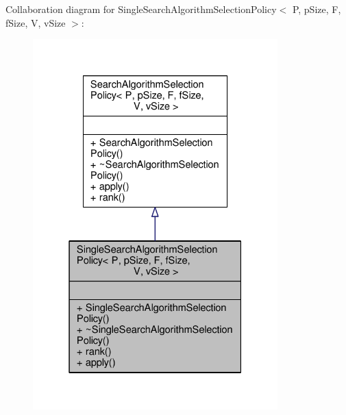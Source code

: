 Collaboration diagram for Single\+Search\+Algorithm\+Selection\+Policy$<$ P, p\+Size, F, f\+Size, V, v\+Size $>$\+:
\nopagebreak
\begin{figure}[H]
\begin{center}
\leavevmode
\includegraphics[width=268pt]{classSingleSearchAlgorithmSelectionPolicy__coll__graph}
\end{center}
\end{figure}

